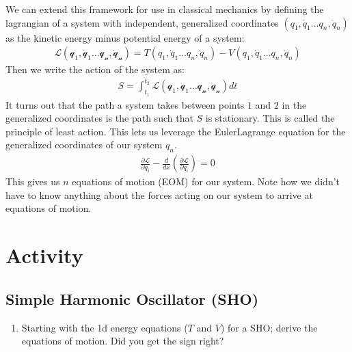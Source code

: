 \documentclass[letterpaper,10pt,english]{jupyterBook}
\begin{document}
\sphinxAtStartPar
We can extend this framework for use in classical mechanics by defining the lagrangian of a system with independent, generalized coordinates \((q_1,\dot{q}_1... q_n,\dot{q}_n)\) as the kinetic energy minus potential energy of a system:
\begin{equation*}
\begin{split}
\mathcal{L(q_1,\dot{q}_1... q_n,\dot{q}_n)} = T(q_1,\dot{q}_1... q_n,\dot{q}_n) - V(q_1,\dot{q}_1... q_n,\dot{q}_n)
\end{split}
\end{equation*}
\sphinxAtStartPar
Then we write the action of the system as:
\begin{equation*}
\begin{split}
S = \int_{t_1}^{t_2} \mathcal{L(q_1,\dot{q}_1... q_n,\dot{q}_n)} dt
\end{split}
\end{equation*}
\sphinxAtStartPar
It turns out that the path a system takes between points \(1\) and \(2\) in the generalized coordinates is the path such that \(S\) is stationary. This is called the principle of least action. This lets us leverage the  Euler\sphinxhyphen{}Lagrange equation for the generalized coordinates of our system \(q_n\).
\begin{equation*}
\begin{split}
\frac{\partial \mathcal{L}}{\partial q_i} - \frac{d}{dx}\left(\frac{\partial \mathcal{L}}{\partial \dot{q}_i} \right) = 0
\end{split}
\end{equation*}
\sphinxAtStartPar
This gives us \(n\) equations of motion (EOM) for our system. Note how we didn’t have to know anything about the forces acting on our system to arrive at equations of motion.


\section{Activity}
\label{\detokenize{content/1_mechanics/lagrange_1:activity}}

\subsection{Simple Harmonic Oscillator (SHO)}
\label{\detokenize{content/1_mechanics/lagrange_1:simple-harmonic-oscillator-sho}}
\sphinxAtStartPar
{}
\begin{enumerate}
%
\item {} 
\sphinxAtStartPar
Starting with the 1d energy equations (\(T\) and \(V\)) for a SHO; derive the equations of motion. Did you get the sign right?

\end{enumerate}
\end{document}

